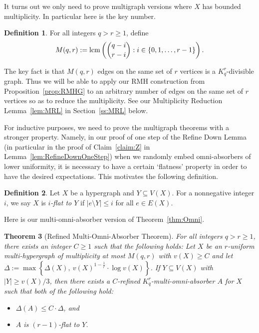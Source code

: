\documentclass[11pt]{article}
\newcounter{i}
\theoremstyle{plain}
\newtheorem{thm}{Theorem}[section]
\theoremstyle{plain} %
\theoremstyle{definition}
\newtheorem{definition}[thm]{Definition}
\begin{document}
It turns out we only need to prove multigraph versions where $X$ has bounded multiplicity. In particular here is the key number.


\begin{definition} For all integers $q>r\ge 1$, 
define 
$$M(q,r):= {\rm lcm}\left( \binom{q-i}{r-i}: i\in \{0,1,\ldots, r-1\}\right).$$    
\end{definition}

The key fact is that $M(q,r)$ edges on the same set of $r$ vertices is a $K_q^r$-divisible graph. Thus we will be able to apply our RMH construction from Proposition~\ref{prop:RMHG} to an arbitrary number of edges on the same set of $r$ vertices so as to reduce the multiplicity. See our Multiplicity Reduction Lemma~\ref{lem:MRL} in Section~\ref{ss:MRL} below.

For inductive purposes, we need to prove the multigraph theorems with a stronger property. Namely, in our proof of one step of the Refine Down Lemma (in particular in the proof of Claim~\ref{claim:Z} in Lemma~\ref{lem:RefineDownOneStep}) when we randomly embed omni-absorbers of lower uniformity, it is necessary to have a certain `flatness' property in order to have the desired expectations. This motivates the following definition.

\begin{definition}
Let $X$ be a hypergraph and $Y\subseteq V(X)$. For a nonnegative integer $i$, we say $X$ is \emph{$i$-flat to $Y$} if $|e\setminus Y|\le i$ for all $e\in E(X)$.
\end{definition}


\noindent Here is our multi-omni-absorber version of Theorem~\ref{thm:Omni}.


\begin{thm}[Refined Multi-Omni-Absorber Theorem]\label{thm:MultiOmni}
For all integers $q > r\ge 1$, there exists an integer $C\ge 1$ such that the following holds: Let $X$ be an $r$-uniform multi-hypergraph of multiplicity at most $M(q,r)$ with $v(X)\ge C$ and let $\Delta:= \max\left\{\Delta(X),~ v(X)^{1-\frac{1}{r}}\cdot \log v(X)\right\}$. If $Y\subseteq V(X)$ with $|Y| \ge v(X)/3$, then there exists a $C$-refined $K_q^r$-multi-omni-absorber $A$ for $X$ such that both of the following hold:
\begin{itemize}
    \item[(1)] $\Delta(A)\le C \cdot \Delta$, and
    \item[(2)] $A$ is $(r-1)$-flat to $Y$. 
\end{itemize}
\end{thm}
\end{document}
